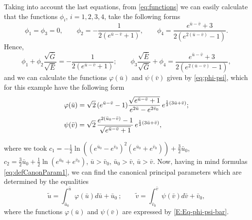 \documentclass[12pt]{amsart}
\theoremstyle{definition}
\theoremstyle{remark}
\newcommand{\ds}{\displaystyle}
\numberwithin{equation}{section}
\begin{document}
Taking into account the last equations, from \eqref{eq:functions} we can easily calculate that the functions $\phi_i$, $i=1,2,3,4$, take the following forms
\begin{equation*}
	\phi_1 = \phi_3=0, \qquad \phi_2  =-\frac{ 1}{2(e^{ \bar{u}-\bar{v}} +1)}, \qquad \phi_4   =\frac{e^{ \bar{u}-\bar{v}} +3}{2(e^{ 2(\bar{u}-\bar{v})} -1)}.
\end{equation*}
Hence,
$$
	\ds \phi_1+\phi_2\frac{\sqrt {\bar G}}{\sqrt {\bar E}} = -\frac{ 1}{2(e^{ \bar{u}-\bar{v}} +1)}; \qquad 
	\ds \phi_3\frac{\sqrt {\bar E}}{\sqrt {\bar G}}+\phi_4 = \frac{e^{ \bar{u}-\bar{v}} +3}{2(e^{ 2(\bar{u}-\bar{v})} -1)}, 
	$$
and we can calculate the functions $\varphi(\bar u)$ and $\psi(\bar v)$ given by \eqref{eq:phi-psi}, which for this example  have the following form
\begin{equation}\label{E:Eq-phi-psi-bar}
\begin{array}{l}
		\vspace{2mm}
\varphi(\bar u) = \ds{\sqrt{2} \,(e^{ \bar{u}-\bar{v}} -1) \frac{\sqrt{e^{ \bar{u}-\bar{v}}+1}}{e^{2\bar{u}}-e^{2\bar{v}_0}} \, e^{\frac{1}{2}(3 \bar{u} +\bar{v})}};\\
\vspace{2mm}
\psi(\bar v) = \ds{\sqrt{2}\, \frac{e^{ 2(\bar{u}_0-\bar{v})}-1}{\sqrt{e^{\bar{u}-\bar{v}}+1}} \, e^{\frac{1}{2}(3 \bar{u} +\bar{v})}},
	\end{array}
\end{equation}
where we took $c_1 = \ds -\frac{1}{2}  \ln \left({ ( e^{\bar{u}_0} - e^{\bar{v}_0})^2 (e^{\bar{u}_0} + e^{\bar{v}_0}) }\right) + \frac{3}{2} \bar{u}_0 $,
$c_2=\ds \frac{3}{2} \bar{u}_0  + \frac{1}{2} \ln{ (e^{\bar{u}_0} + e^{\bar{v}_0}) }$, $\bar{u}>\bar{v}_0$, $\bar{u}_0>\bar{v}$, $\bar{u}>\bar{v}$.
Now, having in mind formulas  \eqref{eq:defCanonParam1}, we can find the canonical principal parameters which are determined by the equalities
\begin{equation*} 
	\tilde u=\int_{\bar{u}_0}^{\bar{u}} \varphi(\bar{u}) d\bar{u} +\bar{u}_0 \ ;   \qquad  \tilde v=\int_{\bar{v}_0}^{\bar{v}} \psi(\bar{v}) d\bar{v} +\bar{v}_0,
		\end{equation*}  
where the functions $\varphi(\bar u)$ and $\psi(\bar v)$ are expressed by \eqref{E:Eq-phi-psi-bar}.
\end{document}
